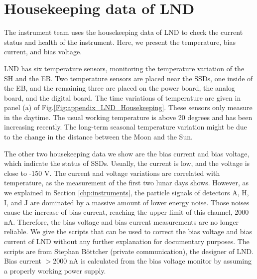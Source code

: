 \section*{Housekeeping data of LND}

The instrument team uses the housekeeping data of \ac{LND} to check the current status and health of the instrument. Here, we present the temperature, bias current, and bias voltage.


\ac{LND} has six temperature sensors, monitoring the temperature variation of the \ac{SH} and the \ac{EB}. Two temperature sensors are placed near the \acp{SSD}, one inside of the \ac{EB}, and the remaining three are placed on the power board, the analog board, and the digital board. The time variations of temperature are given in panel (a) of Fig.\ref{Fig:appendix_LND_Housekeeping}. These sensors only measure in the daytime. The usual working temperature is above 20 degrees and has been increasing recently. The long-term seasonal temperature variation might be due to the change in the distance between the Moon and the Sun.

The other two housekeeping data we show are the bias current and bias voltage, which indicate the status of \acp{SSD}. Usually, the current is low, and the voltage is close to -150 V. The current and voltage variations are correlated with temperature, as the measurement of the first two lunar days shows.
However, as we explained in Section \ref{chp:instruments}, the particle signals of detectors A, H, I, and J are dominated by a massive amount of lower energy noise. Those noises cause the increase of bias current, reaching the upper limit of this channel, 2000 nA. Therefore, the bias voltage and bias current measurements are no longer reliable. We give the scripts that can be used to correct the bias voltage and bias current of \ac{LND} without any further explanation for documentary purposes. The scripts are from Stephan B\"{o}ttcher (private communication), the designer of \ac{LND}. Bias current $>$2000 nA is calculated from the bias voltage monitor by assuming a properly working power supply.



